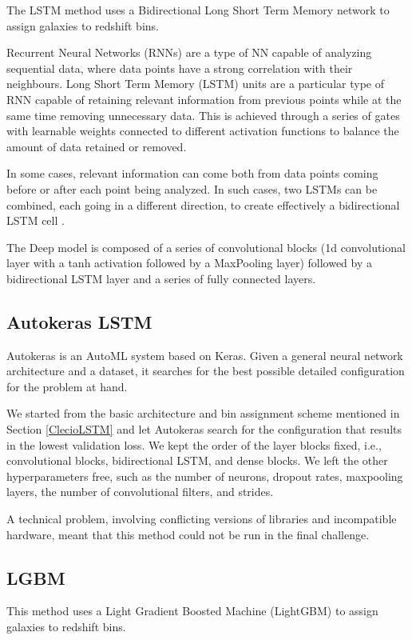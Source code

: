 \documentclass[twocolumn,twocolappendix]{aastex63}
\begin{document}
The LSTM method uses a Bidirectional Long Short Term Memory network to assign galaxies to redshift
bins.
 
Recurrent Neural Networks (RNNs) \citep{schuster, medsker, pascanu} are a type of NN capable of
analyzing sequential data, where data points have a strong correlation with their neighbours. Long
Short Term Memory (LSTM) units are a particular type of RNN capable of retaining relevant
information from previous points while at the same time removing unnecessary data. This is achieved
through a series of gates with learnable weights connected to different activation functions to
balance the amount of data retained or removed.
 
In some cases, relevant information can come both from data points coming before or after each point
being analyzed. In such cases, two LSTMs can be combined, each going in a different direction, to
create effectively a bidirectional LSTM cell \citep{schuster}.
 
The Deep model is composed of a series of convolutional blocks (1d
convolutional layer with a tanh activation followed by a MaxPooling layer) followed by a
bidirectional LSTM layer and a series of fully connected layers. 

\subsection{ {\sc Autokeras LSTM}}
Autokeras \citep{autokeras} is an AutoML system based on Keras. Given a general neural network
architecture and a dataset, it searches for the best possible detailed configuration for the problem
at hand. 
 
We started from the basic architecture and bin assignment scheme mentioned in Section
\ref{ClecioLSTM} and let Autokeras search for the configuration that results in the lowest
validation loss. We kept the order of the layer blocks fixed, i.e., convolutional blocks,
bidirectional LSTM, and dense blocks. We left the other hyperparameters free, such as the number of
neurons,  dropout rates, maxpooling layers, the number of convolutional filters, and strides.

A technical problem, involving conflicting versions of libraries and incompatible hardware,
meant that this method could not be run in the final challenge.


\subsection{ {\sc LGBM} }
This method uses a Light Gradient Boosted Machine (LightGBM) \citep{lgbm} to assign galaxies to
redshift bins.
 
\end{document}
